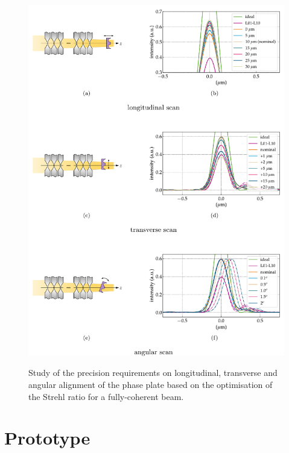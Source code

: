 \begin{refsection}
\begin{figure}[h]
        \centering
        {\includegraphics[width=0.7\linewidth]{figures/ch06/sensitivity_test.pdf}}
        \caption[Alignment sensitivity scan for the corrected system]{Study of the precision requirements on longitudinal, transverse and angular alignment of the phase plate based on the optimisation of the Strehl ratio for a fully-coherent beam.}\label{fig:tolerancing}
\end{figure}

\clearpage
\section{Prototype}\label{sec:prototype}


\end{refsection}
